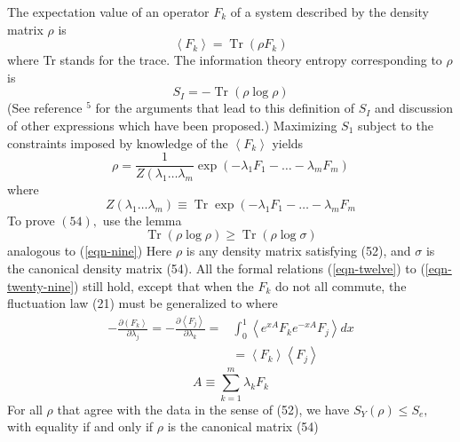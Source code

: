 \documentclass[]{article}
\begin{document}
The expectation value of an operator $F _{ k }$ of a system described by the density matrix $\rho$ is
\begin{equation}
\left\langle F_{k}\right\rangle=\operatorname{Tr}\left(\rho F_{k}\right)
\end{equation}
where Tr stands for the trace. The information theory entropy corresponding to $\rho$ is
\begin{equation}
S_{I}=-\operatorname{Tr}(\rho \log \rho)
\end{equation}
(See reference $^{5}$ for the arguments that lead to this definition of $S_{I}$ and discussion of other expressions which have been proposed.) Maximizing $S_{1}$ subject to the constraints imposed by knowledge of the $\left\langle F _{ k }\right\rangle$ yields
\begin{equation}
\rho=\frac{1}{Z\left(\lambda_{1} \ldots \lambda_{m}\right.} \exp \left(-\lambda_{1} F_{1}-\ldots-\lambda_{m} F_{m}\right)
\end{equation}
where
\begin{equation}
Z \left(\lambda_{1} \ldots \lambda_{ m }\right) \equiv \operatorname{Tr} \exp \left(-\lambda_{1} F _{1}-\ldots-\lambda_{ m } F _{ m }\right.
\end{equation}
To prove $(54),$ use the lemma
\begin{equation}
\operatorname{Tr}(\rho \log \rho) \geq \operatorname{Tr}(\rho \log \sigma)
\end{equation}
analogous to (\ref{eqn-nine}) Here $\rho$ is any density matrix satisfying (52), and $\sigma$ is the canonical density matrix (54). All the formal relations
(\ref{eqn-twelve}) to (\ref{eqn-twenty-nine}) still hold, except that when the $F_{k}$ do not all commute, the fluctuation law (21) must be generalized to
where
\begin{equation}
\begin{aligned}
-\frac{\partial\left(F_{k}\right\rangle}{\partial \lambda_{j}}=-\frac{\partial\left\langle F_{j}\right\rangle}{\partial \lambda_{ k }}=& \int_{0}^{1}\left\langle e^{x A} F_{k} e^{-x A} F_{j}\right\rangle d x \\
&=\left\langle F_{k}\right\rangle\left\langle F_{j}\right\rangle
\end{aligned}
\end{equation}
\begin{equation}
A \equiv \sum_{ k =1}^{ m } \lambda_{ k } F _{ k }
\end{equation}
For all $\rho$ that agree with the data in the sense of (52), we have $S_{Y}(\rho) \leq S_{e},$ with equality if and only if $\rho$ is the canonical matrix (54)
\end{document}
